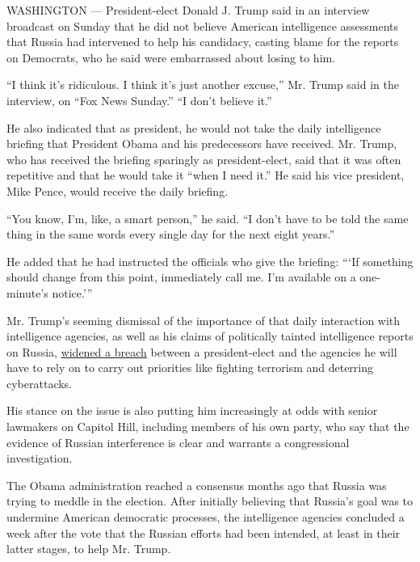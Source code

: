 WASHINGTON --- President-elect Donald J. Trump said in an interview
broadcast on Sunday that he did not believe American intelligence
assessments that Russia had intervened to help his candidacy, casting
blame for the reports on Democrats, who he said were embarrassed about
losing to him.

``I think it's ridiculous. I think it's just another excuse,'' Mr. Trump
said in the interview, on ``Fox News Sunday.'' ``I don't believe it.''

He also indicated that as president, he would not take the daily
intelligence briefing that President Obama and his predecessors have
received. Mr. Trump, who has received the briefing sparingly as
president-elect, said that it was often repetitive and that he would
take it ``when I need it.'' He said his vice president, Mike Pence,
would receive the daily briefing.

``You know, I'm, like, a smart person,'' he said. ``I don't have to be
told the same thing in the same words every single day for the next
eight years.''

He added that he had instructed the officials who give the briefing:
```If something should change from this point, immediately call me. I'm
available on a one-minute's notice.'''

Mr. Trump's seeming dismissal of the importance of that daily
interaction with intelligence agencies, as well as his claims of
politically tainted intelligence reports on Russia,
\href{https://www.nytimes.com/2016/12/10/us/politics/trump-mocking-claim-that-russia-hacked-election-at-odds-with-gop.html?hp\&action=click\&pgtype=Homepage\&clickSource=story-heading\&module=first-column-region\&region=top-news\&WT.nav=top-news}{widened
a breach} between a president-elect and the agencies he will have to
rely on to carry out priorities like fighting terrorism and deterring
cyberattacks.

His stance on the issue is also putting him increasingly at odds with
senior lawmakers on Capitol Hill, including members of his own party,
who say that the evidence of Russian interference is clear and warrants
a congressional investigation.

The Obama administration reached a consensus months ago that Russia was
trying to meddle in the election. After initially believing that
Russia's goal was to undermine American democratic processes, the
intelligence agencies concluded a week after the vote that the Russian
efforts had been intended, at least in their latter stages, to help Mr.
Trump.

